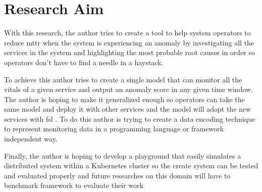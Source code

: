 \section{Research Aim}

With this research, the author tries to create a tool to help system operators to reduce \ac{mttr} when the system is experiencing an anomaly by investigating all the services in the system and highlighting the most probable root causes in order so operators don't have to find a needle in a haystack.

To achieve this author tries to create a single model that can monitor all the vitals of a given service and output an anomaly score in any given time window. The author is hoping to make it generalized enough so operators can take the same model and deploy it with other services and the model will adopt the new services with \ac{fsl} \citep{wang2020generalizing}. To do this author is trying to create a data encoding technique to represent monitoring data in a programming language or framework independent way.

Finally, the author is hoping to develop a playground that easily simulates a distributed system within a Kubernetes cluster so the create system can be tested and evaluated properly and future researches on this domain will have to benchmark framework to evaluate their work
